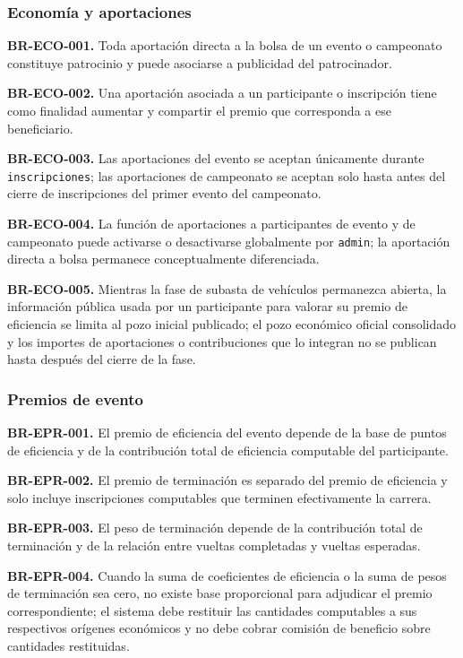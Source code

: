 \documentclass[10pt,letterpaper]{article}
\begin{document}
\subsubsection{Economía y aportaciones}
\noindent\textbf{BR-ECO-001.} Toda aportación directa a la bolsa de un evento o campeonato constituye patrocinio y puede asociarse a publicidad del patrocinador.\par
\noindent\textbf{BR-ECO-002.} Una aportación asociada a un participante o inscripción tiene como finalidad aumentar y compartir el premio que corresponda a ese beneficiario.\par
\noindent\textbf{BR-ECO-003.} Las aportaciones del evento se aceptan únicamente durante \texttt{inscripciones}; las aportaciones de campeonato se aceptan solo hasta antes del cierre de inscripciones del primer evento del campeonato.\par
\noindent\textbf{BR-ECO-004.} La función de aportaciones a participantes de evento y de campeonato puede activarse o desactivarse globalmente por \texttt{admin}; la aportación directa a bolsa permanece conceptualmente diferenciada.\par
\noindent\textbf{BR-ECO-005.} Mientras la fase de subasta de vehículos permanezca abierta, la información pública usada por un participante para valorar su premio de eficiencia se limita al pozo inicial publicado; el pozo económico oficial consolidado y los importes de aportaciones o contribuciones que lo integran no se publican hasta después del cierre de la fase.\par
\subsubsection{Premios de evento}
\noindent\textbf{BR-EPR-001.} El premio de eficiencia del evento depende de la base de puntos de eficiencia y de la contribución total de eficiencia computable del participante.\par
\noindent\textbf{BR-EPR-002.} El premio de terminación es separado del premio de eficiencia y solo incluye inscripciones computables que terminen efectivamente la carrera.\par
\noindent\textbf{BR-EPR-003.} El peso de terminación depende de la contribución total de terminación y de la relación entre vueltas completadas y vueltas esperadas.\par
\noindent\textbf{BR-EPR-004.} Cuando la suma de coeficientes de eficiencia o la suma de pesos de terminación sea cero, no existe base proporcional para adjudicar el premio correspondiente; el sistema debe restituir las cantidades computables a sus respectivos orígenes económicos y no debe cobrar comisión de beneficio sobre cantidades restituidas.\par
\end{document}
